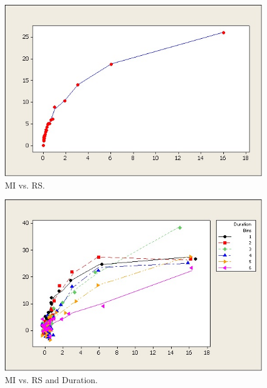 	
	\begin{figure}[!ht]
	\centering
	\includegraphics[width=\textwidth]{chapters/chapter_exec_models/figures/fig3.jpg}
	\caption{MI vs. RS. \label{fig:oneoffive}}
	\end{figure}

	\begin{figure}
	\centering
	\includegraphics[width=\textwidth]{chapters/chapter_exec_models/figures/fig4.jpg}
	\caption{MI vs. RS and Duration. \label{fig:twooffive}}
	\end{figure}


